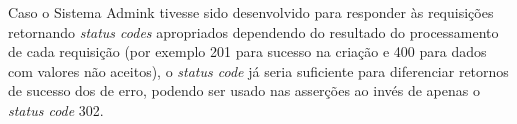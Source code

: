     
    
    Caso o Sistema Admink tivesse sido desenvolvido para responder às requisições retornando \emph{status codes} apropriados dependendo do resultado do processamento de cada requisição (por exemplo 201 para sucesso na criação e 400 para dados com valores não aceitos), o \emph{status code} já seria suficiente para diferenciar retornos de sucesso dos de erro, podendo ser usado nas asserções ao invés de apenas o \emph{status code} 302. 